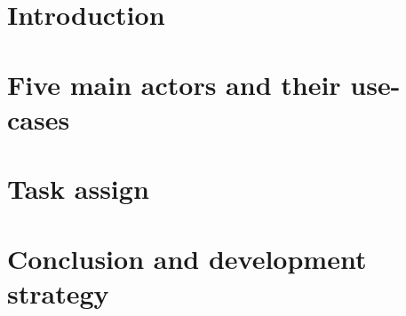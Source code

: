 \documentclass[a4paper]{article}
\begin{document}
\begin{titlepage}

\end{titlepage}
\newpage
\tableofcontents
\newpage

\section{Introduction}

\section{Five main actors and their use-cases}

\section{Task assign}

\section{Conclusion and development strategy}


\end{document}
